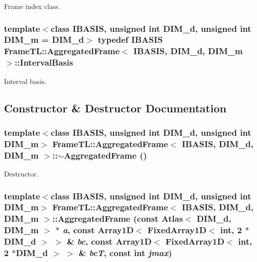 Frame index class. \hypertarget{classFrameTL_1_1AggregatedFrame_989c4119c49eeea3d42689317393e35a}{
\subsubsection[IntervalBasis]{\setlength{\rightskip}{0pt plus 5cm}template$<$class IBASIS, unsigned int DIM\_\-d, unsigned int DIM\_\-m = DIM\_\-d$>$ {\bf typedef} IBASIS {\bf FrameTL::AggregatedFrame}$<$ IBASIS, DIM\_\-d, DIM\_\-m $>$::{\bf IntervalBasis}}}
\label{classFrameTL_1_1AggregatedFrame_989c4119c49eeea3d42689317393e35a}


Interval basis. 

\subsection{Constructor \& Destructor Documentation}
\hypertarget{classFrameTL_1_1AggregatedFrame_855b4a899b7f5845cd81029909bd8a19}{
\subsubsection[$\sim$AggregatedFrame]{\setlength{\rightskip}{0pt plus 5cm}template$<$class IBASIS, unsigned int DIM\_\-d, unsigned int DIM\_\-m$>$ {\bf FrameTL::AggregatedFrame}$<$ IBASIS, DIM\_\-d, DIM\_\-m $>$::$\sim${\bf AggregatedFrame} ()}}
\label{classFrameTL_1_1AggregatedFrame_855b4a899b7f5845cd81029909bd8a19}


Destructor. \hypertarget{classFrameTL_1_1AggregatedFrame_653c47a2514e9099a56935f7b5819377}{
\subsubsection[AggregatedFrame]{\setlength{\rightskip}{0pt plus 5cm}template$<$class IBASIS, unsigned int DIM\_\-d, unsigned int DIM\_\-m$>$ {\bf FrameTL::AggregatedFrame}$<$ IBASIS, DIM\_\-d, DIM\_\-m $>$::{\bf AggregatedFrame} (const Atlas$<$ DIM\_\-d, DIM\_\-m $>$ $\ast$ {\em a}, \/  const Array1D$<$ FixedArray1D$<$ int, 2 $\ast$DIM\_\-d $>$ $>$ \& {\em bc}, \/  const Array1D$<$ FixedArray1D$<$ int, 2 $\ast$DIM\_\-d $>$ $>$ \& {\em bcT}, \/  const int {\em jmax})}}
\label{classFrameTL_1_1AggregatedFrame_653c47a2514e9099a56935f7b5819377}


